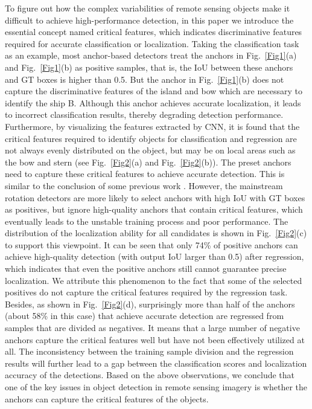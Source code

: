 \documentclass[journal]{IEEEtran}
\begin{document}
To figure out how the complex variabilities of remote sensing objects make it difficult to achieve high-performance detection, in this paper we introduce the essential concept named critical features, which indicates discriminative features required for accurate classification or localization. Taking the classification task as an example, most anchor-based detectors treat the anchors in Fig.~\ref{Fig1}(a) and Fig.~\ref{Fig1}(b) as positive samples, that is, the IoU between these anchors and GT boxes is higher than 0.5. But the anchor in Fig.~\ref{Fig1}(b) does not capture the discriminative features of the island and bow which are necessary to identify the ship B. Although this anchor achieves accurate localization, it leads to incorrect classification results, thereby degrading detection performance. Furthermore, by visualizing the features extracted by CNN, it is found that the critical features required to identify objects for classification and regression are not always evenly distributed on the object, but may be on local areas such as the bow and stern (see Fig.~\ref{Fig2}(a) and Fig.~\ref{Fig2}(b)). The preset anchors need to capture these critical features to achieve accurate detection. This is similar to the conclusion of some previous work \cite{li2016novel,wu2018inshore}. However, the mainstream rotation detectors are more likely to select anchors with high IoU with GT boxes as positives, but ignore high-quality anchors that contain critical features, which eventually leads to the unstable training process and poor performance. The distribution of the localization ability for all candidates is shown in Fig.~\ref{Fig2}(c) to support this viewpoint. It can be seen that only 74\% of positive anchors can achieve high-quality detection (with output IoU larger than 0.5) after regression, which indicates that even the positive anchors still cannot guarantee precise localization. We attribute this phenomenon to the fact that some of the selected positives do not capture the critical features required by the regression task. Besides, as shown in Fig.~\ref{Fig2}(d), surprisingly more than half of the anchors (about 58\% in this case) that achieve accurate detection are regressed from samples that are divided as negatives. It means that a large number of negative anchors capture the critical features well but have not been effectively utilized at all. The inconsistency between the training sample division and the regression results will further lead to a gap between the classification scores and localization accuracy of the detections. Based on the above observations, we conclude that one of the key issues in object detection in remote sensing imagery is whether the anchors can capture the critical features of the objects.
\end{document}
